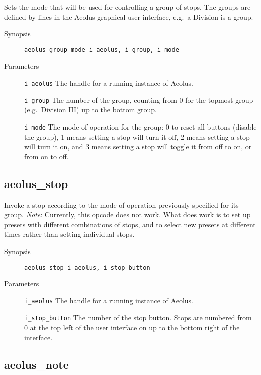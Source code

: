 \documentclass[english,11pt,letterpaper,onecolumn]{scrartcl}
\begin{document}
{Sets the mode that will be used for controlling a group of stops. The groups are defined by lines in the Aeolus graphical user interface, e.g.\ a Division is a group.

\begin{description}
	\item[Synopsis]
	\item[]\lstinline|aeolus_group_mode i_aeolus, i_group, i_mode|
	\item[Parameters]
	\item[]\lstinline|i_aeolus| The handle for a running instance of Aeolus.
	\item[]\lstinline|i_group| The number of the group, counting from 0 for the topmost group (e.g.\ Division III) up to the bottom group.
	\item[]\lstinline|i_mode| The mode of operation for the group: 0 to reset all buttons (disable the group), 1 means setting a stop will turn it off, 2 means setting a stop will turn it on, and 3 means setting a stop will toggle it from off to on, or from on to off.
\end{description}

\subsection*{aeolus\_stop}

Invoke a stop according to the mode of operation previously specified for its group. \emph{Note}: Currently, this opcode does not work. What does work is to set up presets with different combinations of stops, and to select new presets at different times rather than setting individual stops.

\begin{description}
	\item[Synopsis]
	\item[]\lstinline|aeolus_stop i_aeolus, i_stop_button|
	\item[Parameters]
	\item[]\lstinline|i_aeolus| The handle for a running instance of Aeolus.
	\item[]\lstinline|i_stop_button| The number of the stop button. Stops are numbered from 0 at the top left of the user interface on up to the bottom right of the interface.
\end{description}

\subsection*{aeolus\_note}

}
\end{document}
